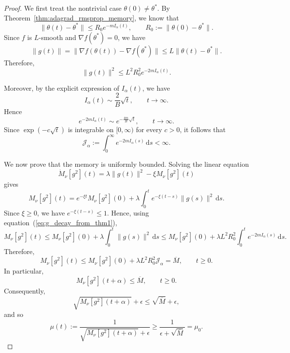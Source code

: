 \documentclass[10pt,a4paper]{amsart}
\begin{document}
\begin{proof}
We first treat the nontrivial case \(\theta(0)\neq \theta^*\). By Theorem~\ref{thm:adagrad_rmsprop_memory}, we know that
\[
\|\theta(t)-\theta^*\|
\le
R_0 e^{-mI_\alpha(t)},
\qquad
R_0:=\|\theta(0)-\theta^*\|.
\]
Since \(f\) is \(L\)-smooth and \(\nabla f(\theta^*)=0\), we have
\[
\|g(t)\|
=
\|\nabla f(\theta(t))-\nabla f(\theta^*)\|
\le
L\|\theta(t)-\theta^*\|.
\]
Therefore,
\begin{equation}
\label{eq:g_decay_from_thm1}
\|g(t)\|^2
\le
L^2R_0^2 e^{-2mI_\alpha(t)}.
\end{equation}

Moreover, by the explicit expression of \(I_\alpha(t)\), we have
\[
I_\alpha(t)\sim \frac{2}{B}\sqrt t,
\qquad t\to\infty.
\]
Hence
\[
e^{-2mI_\alpha(t)}
\sim
e^{-\frac{4m}{B}\sqrt t},
\qquad t\to\infty.
\]
Since \(\exp(-c\sqrt t)\) is integrable on \([0,\infty)\) for every \(c>0\), it follows that
\[
\mathcal J_\alpha
:=
\int_0^\infty e^{-2mI_\alpha(s)}\,\mathrm ds
<
\infty.
\]

We now prove that the memory is uniformly bounded.  Solving the linear equation
\begin{equation}\label{eq:M_nu_differential}
\dot M_\nu[g^2](t)
=
\lambda\|g(t)\|^2-\xi M_\nu[g^2](t)
\end{equation}
gives
\[
M_\nu[g^2](t)
=
e^{-\xi t}M_\nu[g^2](0)
+
\lambda
\int_0^t
e^{-\xi(t-s)}\|g(s)\|^2\,\mathrm ds.
\]
Since \(\xi\ge 0\), we have \(e^{-\xi(t-s)}\le 1\). Hence, using equation~(\ref{eq:g_decay_from_thm1}),
\[
M_\nu[g^2](t)
\le
M_\nu[g^2](0)
+
\lambda
\int_0^t
\|g(s)\|^2\,\mathrm ds
\le
M_\nu[g^2](0)
+
\lambda L^2R_0^2
\int_0^t
e^{-2mI_\alpha(s)}\,\mathrm ds.
\]
Therefore,
\[
M_\nu[g^2](t)
\le
M_\nu[g^2](0)
+
\lambda L^2R_0^2\mathcal J_\alpha
=
\overline M,
\qquad
t\ge 0.
\]
In particular,
\[
M_\nu[g^2](t+\alpha)\le \overline M,
\qquad
t\ge 0.
\]
Consequently,
\[
\sqrt{M_\nu[g^2](t+\alpha)}+\epsilon
\le
\sqrt{\overline M}+\epsilon,
\]
and so
\begin{equation}
\label{eq:mu_lower_thm2}
\mu(t)
:=
\frac{1}{\sqrt{M_\nu[g^2](t+\alpha)}+\epsilon}
\ge
\frac{1}{\epsilon+\sqrt{\overline M}}
=
\mu_0.
\end{equation}


\end{proof}
\end{document}
